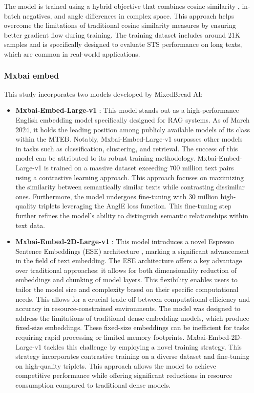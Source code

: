 The model is trained using a hybrid objective that combines cosine similarity , in-batch negatives, and angle differences in complex space.
This approach helps overcome the limitations of traditional cosine similarity  measures by ensuring better gradient flow during training.
The training dataset includes around 21K samples and is specifically designed to evaluate \ac{STS} performance on long texts, which are common in real-world applications.

\subsubsection{Mxbai embed}
This study incorporates two models developed by MixedBread AI:
\begin{itemize}
  \item \textbf{Mxbai-Embed-Large-v1} \cite{emb2024mxbai}:
 This model stands out as a high-performance English embedding model specifically designed for \ac{RAG} systems.
 As of March 2024, it holds the leading position among publicly available models of its class within the \ac{MTEB}.
 Notably, Mxbai-Embed-Large-v1 surpasses other models in tasks such as classification, clustering, and retrieval.
 The success of this model can be attributed to its robust training methodology.
 Mxbai-Embed-Large-v1 is trained on a massive dataset exceeding 700 million text pairs using a contrastive learning approach.
 This approach focuses on maximizing the similarity between semantically similar texts while contrasting dissimilar ones.
 Furthermore, the model undergoes fine-tuning with 30 million high-quality triplets leveraging the AnglE \cite{li2024angleoptimized} loss function.
 This fine-tuning step further refines the model's ability to distinguish semantic relationships within text data.
  \item \textbf{Mxbai-Embed-2D-Large-v1} \cite{emb2024mxbai2d}:
 This model introduces a novel Espresso Sentence Embeddings (ESE) architecture \cite{li2024ese}, marking a significant advancement in the field of text embedding.
 The ESE architecture offers a key advantage over traditional approaches: it allows for both dimensionality reduction of embeddings and chunking of model layers.
 This flexibility enables users to tailor the model size and complexity based on their specific computational needs.
 This allows for a crucial trade-off between computational efficiency and accuracy in resource-constrained environments.
 The model was designed to address the limitations of traditional dense embedding models, which produce fixed-size embeddings.
 These fixed-size embeddings can be inefficient for tasks requiring rapid processing or limited memory footprints.
 Mxbai-Embed-2D-Large-v1 tackles this challenge by employing a novel training strategy.
 This strategy incorporates contrastive training on a diverse dataset and fine-tuning on high-quality triplets.
 This approach allows the model to achieve competitive performance while offering significant reductions in resource consumption compared to traditional dense models.
\end{itemize}

